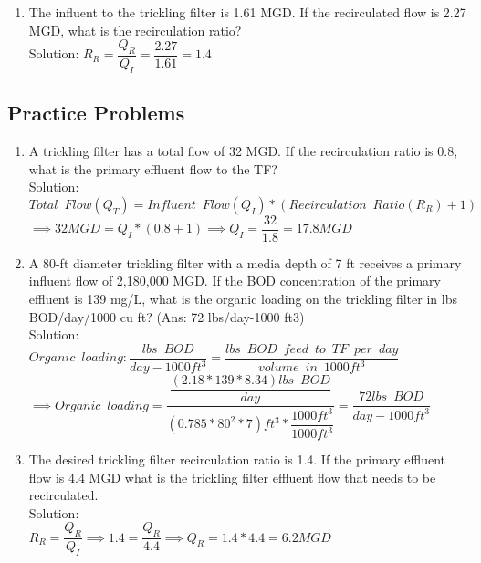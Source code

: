 \documentclass{article}
\begin{document}
\begin{enumerate}
\item The influent to the trickling filter is 1.61 MGD. If the recirculated flow is 2.27 MGD, what is the recirculation ratio?\\
Solution:  $R_R=\dfrac{Q_R}{Q_I}=\dfrac{2.27}{1.61}=\boxed{1.4}$\\
\end{enumerate}

\subsection{Practice Problems} 

\begin{enumerate}

\item A trickling filter has a total flow of 32 MGD.  If the recirculation ratio is 0.8, what is the primary effluent flow to the TF?\\
Solution:\\
$Total \enspace Flow (Q_T) = Influent \enspace Flow (Q_I)*(Recirculation \enspace Ratio(R_R) +1)$\\
$\implies 32 MGD=Q_I*(0.8+1)\implies Q_I=\dfrac{32}{1.8}=\boxed{17.8 MGD}$

\item A 80-ft diameter trickling filter with a media depth of 7 ft receives a primary influent flow of 2,180,000 MGD. If the BOD concentration of the primary effluent is 139 mg/L, what is the organic loading on the trickling filter in lbs BOD/day/1000 cu ft? (Ans: 72 lbs/day-1000 ft3)\\
Solution:\\
$Organic \enspace loading:\dfrac{lbs \enspace BOD}{day-1000ft^3}=\dfrac{lbs \enspace BOD \enspace feed \enspace to \enspace TF \enspace per \enspace day}{volume \enspace in \enspace 1000ft^3}$\\
\vspace{0.3cm}
$\implies Organic \enspace loading=\dfrac{\dfrac{(2.18*139*8.34)lbs \enspace BOD}{day}}{(0.785*80^2*7)ft^3*\dfrac{1000ft^3}{1000ft^3}}=\boxed{\dfrac{72 lbs \enspace BOD}{day-1000 ft^3}}$

\item The desired trickling filter recirculation ratio is 1.4.  If the primary effluent flow is 4.4 MGD what is the trickling filter effluent flow that needs to be recirculated.\\
Solution:\\
$R_R=\dfrac{Q_R}{Q_I}\implies 1.4=\dfrac{Q_R}{4.4}\implies Q_R =1.4*4.4=\boxed{6.2 MGD}$\\


\end{enumerate}
\end{document}
